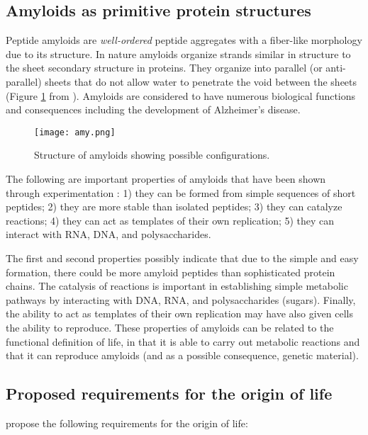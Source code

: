 \subsection{Amyloids as primitive protein structures}
Peptide amyloids are \emph{well-ordered} peptide aggregates with a fiber-like morphology due to its structure.
In nature amyloids organize \textbeta strands similar in structure to the \textbeta sheet secondary structure in proteins.
They organize into parallel (or anti-parallel) sheets that do not allow water to penetrate the void between the sheets (Figure \ref{fig:amy} from ).
Amyloids are considered to have numerous biological functions and consequences including the development of Alzheimer's disease.

\begin{figure}[h]
    \centering
    \texttt{[image: amy.png]}
    \label{fig:amy}
    \caption{Structure of amyloids showing possible configurations.}
\end{figure}

The following are important properties of amyloids that have been shown through experimentation \cite{Greenwald2018}:
1) they can be formed from simple sequences of short peptides;
2) they are more stable than isolated peptides;
3) they can catalyze reactions;
4) they can act as templates of their own replication;
5) they can interact with RNA, DNA, and polysaccharides.

The first and second properties possibly indicate that due to the simple and easy formation, there could be more amyloid peptides than sophisticated protein chains.
The catalysis of reactions is important in establishing simple metabolic pathways by interacting with DNA, RNA, and polysaccharides (sugars).
Finally, the ability to act as templates of their own replication may have also given cells the ability to reproduce.
These properties of amyloids can be related to the functional definition of life, in that it is able to carry out metabolic reactions and that it can reproduce amyloids (and as a possible consequence, genetic material).

\subsection{Proposed requirements for the origin of life}
 propose the following requirements for the origin of life:

